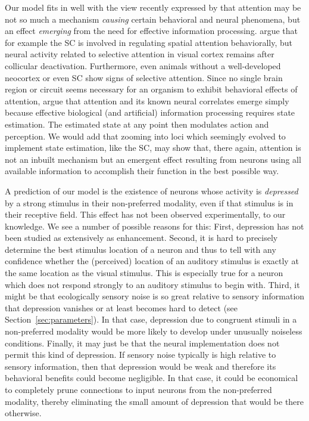     Our model fits in well with the view recently expressed by \citet{krauzlis-et-al-2014} that attention may be not so much a mechanism \emph{causing} certain behavioral and neural phenomena, but an effect \emph{emerging} from the need for effective information processing.
    \citet{krauzlis-et-al-2014} argue that for example the \ac{SC} is involved in regulating spatial attention behaviorally, but neural activity related to selective attention in visual cortex remains after collicular deactivation.
    Furthermore, even animals without a well-developed neocortex or even \ac{SC} show signs of selective attention.
    Since no single brain region or circuit seems necessary for an organism to exhibit behavioral effects of attention, \citet{krauzlis-et-al-2014} argue that attention and its known neural correlates emerge simply because effective biological (and artificial) information processing requires state estimation.
    The estimated state at any point then modulates action and perception.
    We would add that zooming into loci which seemingly evolved to implement state estimation, like the \ac{SC}, may show that, there again, attention is not an inbuilt mechanism but an emergent effect resulting from neurons using all available information to accomplish their function in the best possible way.
    
    A prediction of our model is the existence of neurons whose activity is \emph{depressed} by a strong stimulus in their non-preferred modality, even if that stimulus is in their receptive field.
    This effect has not been observed experimentally, to our knowledge.
    We see a number of possible reasons for this:
    First, depression has not been studied as extensively as enhancement.
    Second, it is hard to precisely determine the best stimulus location of a neuron and thus to tell with any confidence whether the (perceived) location of an auditory stimulus is exactly at the same location as the visual stimulus.
    This is especially true for a neuron which does not respond strongly to an auditory stimulus to begin with.
    Third, it might be that ecologically sensory noise is so great relative to sensory information that depression vanishes or at least becomes hard to detect (see Section~\ref{sec:parameters}).
    In that case, depression due to congruent stimuli in a non-preferred modality would be more likely to develop under unusually noiseless conditions.
    Finally, it may just be that the neural implementation does not permit this kind of depression.
    If sensory noise typically is high relative to sensory information, then that depression would be weak and therefore its behavioral benefits could become negligible.
    In that case, it could be economical to completely prune connections to input neurons from the non-preferred modality, thereby eliminating the small amount of depression that would be there otherwise.

